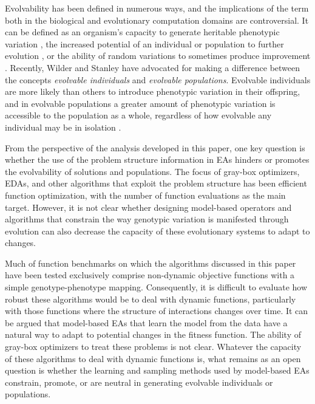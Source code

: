 \documentclass{article} %
\begin{document}
 Evolvability has been defined in numerous ways, and the implications of the term both in the biological and evolutionary computation domains are controversial. It can be defined as an organism's capacity to generate heritable phenotypic variation \cite{Kirschner_and_Gerhart:1998}, the  increased potential of an individual or population to further evolution \cite{Mengistu_et_al:2016}, or the ability of random variations to sometimes produce improvement \cite{Wagner_et_al:1996}. Recently,  Wilder and Stanley  \cite{Wilder_and_Stanley:2015} have advocated for making a difference between the concepts \emph{evolvable individuals} and \emph{evolvable populations}. Evolvable individuals are more likely than others to introduce phenotypic variation in their offspring, and in evolvable populations a greater amount of phenotypic variation is accessible to the population as a whole, regardless of how evolvable any individual may be in isolation  \cite{Wilder_and_Stanley:2015}.

From the perspective of the analysis developed in this paper, one key question is whether the use of the problem structure information in EAs hinders or promotes the evolvability of solutions and populations. The focus of gray-box optimizers, EDAs, and other algorithms that exploit the problem structure has been  efficient function optimization, with the number of function evaluations as the main target. However, it is not clear whether designing model-based operators and algorithms that constrain the way genotypic variation is manifested through evolution can also decrease the capacity of these evolutionary systems to adapt to changes. 

Much of function benchmarks on which the algorithms discussed in this paper have been tested exclusively comprise non-dynamic objective functions with a simple genotype-phenotype mapping. Consequently,  it is difficult to evaluate how robust these algorithms would be to deal with dynamic  functions, particularly with those functions where the structure of interactions changes over time. It can be argued that model-based EAs that learn the model from the data have a natural way to adapt to potential changes in the fitness function. The ability of gray-box optimizers to treat these problems is not clear. Whatever the capacity of these algorithms to deal with dynamic functions is, what remains as an open question is whether the learning and sampling methods used by model-based EAs constrain, promote, or are neutral in generating evolvable individuals or populations. 
\end{document}
